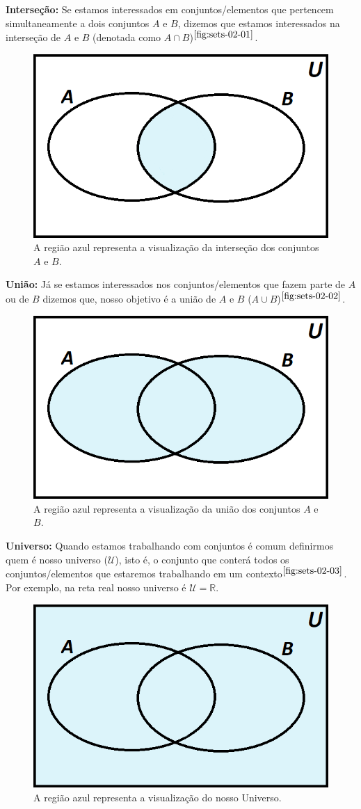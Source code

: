   \textbf{Interseção:} Se estamos interessados em conjuntos/elementos que pertencem simultaneamente a dois conjuntos $A$ e $B$, dizemos que estamos interessados na interseção de $A$ e $B$ (denotada como $A \cap B$)$^{\ref{fig:sets-02-01}}$.

  \begin{figure}[hbt!]
      \centering
      \includegraphics[width = 7 cm]{figures/sets/fig-sets-02-01.png}
      \caption{A região azul representa a visualização da interseção dos conjuntos $A$ e $B$.}
      \label{fig:sets-02-01}
  \end{figure}

  \textbf{União:} Já se estamos interessados nos conjuntos/elementos que fazem parte de $A$ ou de $B$ dizemos que, nosso objetivo é a união de $A$ e $B$ ($A \cup B$)$^{\ref{fig:sets-02-02}}$.

  \begin{figure}[hbt!]
      \centering
      \includegraphics[width = 7 cm]{figures/sets/fig-sets-02-02.png}
      \caption{A região azul representa a visualização da união dos conjuntos $A$ e $B$.}
      \label{fig:sets-02-02}
  \end{figure}

  \textbf{Universo:} Quando estamos trabalhando com conjuntos é comum definirmos quem é nosso universo ($ \mathcal U $), isto é, o conjunto que conterá todos os conjuntos/elementos que estaremos trabalhando em um contexto$^{\ref{fig:sets-02-03}}$. Por exemplo, na reta real nosso universo é $\mathcal U = \mathbb{R}$.

  \begin{figure}[hbt!]
      \centering
      \includegraphics[width = 7 cm]{figures/sets/fig-sets-02-03.png}
      \caption{A região azul representa a visualização do nosso Universo.}
      \label{fig:sets-02-03}
  \end{figure}

